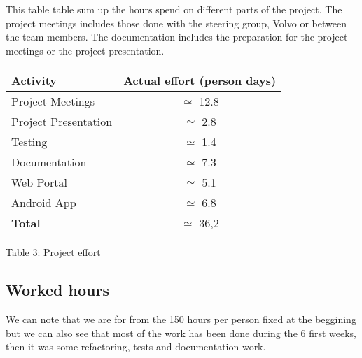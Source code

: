 \documentclass{article}
\begin{document}
This table table sum up the hours spend on different parts of the project. The project meetings includes those done with the steering group, Volvo or between the team members. The documentation includes the preparation for the project meetings or the project presentation.

\begin{center}
\begin{tabular}{|p{5cm}|c|}
\hline
\textbf{Activity} & \textbf{Actual effort (person days)} \\ \hline
Project Meetings & $\simeq$ 12.8 \\ \hline
Project Presentation & $\simeq$ 2.8 \\ \hline
Testing & $\simeq$ 1.4 \\ \hline
Documentation & $\simeq$ 7.3 \\ \hline 
Web Portal & $\simeq$ 5.1 \\ \hline 
Android App & $\simeq$ 6.8 \\ \hline
\textbf{Total} & $\simeq$ 36,2 \\ \hline
\end{tabular}
\end{center}
\begin{center}
\caption{Table 3: Project effort}
\end{center}

\subsection{Worked hours}

We can note that we are for from the 150 hours per person fixed at the beggining but we can also see that most of the work has been done during the 6 first weeks, then it was some refactoring, tests and documentation work.
\end{document}
